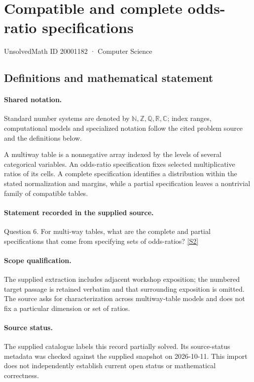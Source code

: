 \documentclass[11pt]{article}
\newcommand{\sref}[2]{\hyperlink{source:#1:#2}{[S#2]}}
\begin{document}
\setcounter{section}{20001181}
\section{Compatible and complete odds-ratio specifications}\label{20001182}
{\small\sffamily UnsolvedMath ID 20001182 · Computer Science}
\subsection{Definitions and mathematical statement}

\paragraph{Shared notation.}Standard number systems are denoted by $\mathbb N,\mathbb Z,\mathbb Q,\mathbb R,\mathbb C$; index ranges, computational models and specialized notation follow the cited problem source and the definitions below.


A multiway table is a nonnegative array indexed by the levels of several categorical variables. An odds-ratio specification fixes selected multiplicative ratios of its cells. A complete specification identifies a distribution within the stated normalization and margins, while a partial specification leaves a nontrivial family of compatible tables.
\paragraph{Statement recorded in the supplied source.}
Question 6. For multi-way tables, what are the complete and partial specifications that come from specifying sets of odds-ratios? \sref{20001182}{2}
\paragraph{Scope qualification.}
The supplied extraction includes adjacent workshop exposition; the numbered target passage is retained verbatim and that surrounding exposition is omitted. The source asks for characterization across multiway-table models and does not fix a particular dimension or set of ratios.
\paragraph{Source status.}
The supplied catalogue labels this record partially solved. Its source-status metadata was checked against the supplied snapshot on 2026-10-11. This import does not independently establish current open status or mathematical correctness.
\end{document}
